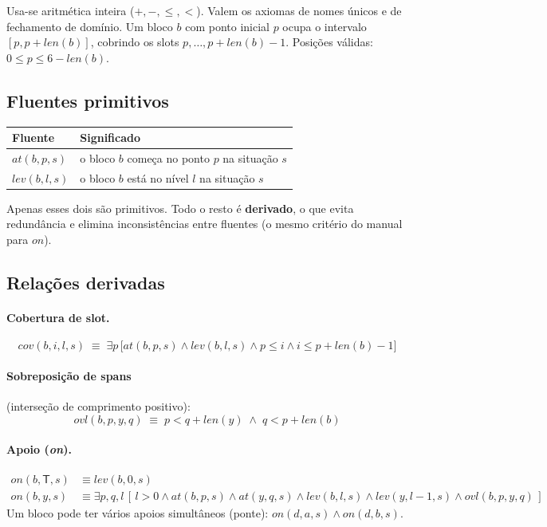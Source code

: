 \documentclass[11pt,a4paper]{article}
\newcommand{\At}{\mathit{at}}
\newcommand{\Lev}{\mathit{lev}}
\newcommand{\On}{\mathit{on}}
\newcommand{\Cov}{\mathit{cov}}
\newcommand{\Ovl}{\mathit{ovl}}
\newcommand{\Len}{\mathit{len}}
\newcommand{\Mesa}{\mathsf{T}}
\begin{document}
\medskip
Usa-se aritmética inteira ($+,-,\le,<$). Valem os axiomas de nomes únicos e de fechamento de domínio.
Um bloco $b$ com ponto inicial $p$ ocupa o intervalo $[p,p+\Len(b)]$, cobrindo os slots $p,\dots,p+\Len(b)-1$. Posições válidas: $0\le p\le 6-\Len(b)$.

\subsection{Fluentes primitivos}

\begin{center}
\begin{tabular}{@{}lp{9.5cm}@{}}
\toprule
Fluente & Significado \\
\midrule
$\At(b,p,s)$ & o bloco $b$ começa no ponto $p$ na situação $s$ \\
$\Lev(b,l,s)$ & o bloco $b$ está no nível $l$ na situação $s$ \\
\bottomrule
\end{tabular}
\end{center}

Apenas esses dois são primitivos. Todo o resto é \textbf{derivado}, o que evita redundância e elimina inconsistências entre fluentes (o mesmo critério do manual para $\On$).

\subsection{Relações derivadas}

\paragraph{Cobertura de slot.}
\[
\Cov(b,i,l,s)\;\equiv\;\exists p\,\big[\At(b,p,s)\wedge\Lev(b,l,s)\wedge p\le i\wedge i\le p+\Len(b)-1\big]
\]

\paragraph{Sobreposição de spans} (interseção de comprimento positivo):
\[
\Ovl(b,p,y,q)\;\equiv\; p<q+\Len(y)\;\wedge\; q<p+\Len(b)
\]

\paragraph{Apoio (\emph{on}).}
\begin{align*}
\On(b,\Mesa,s)&\equiv \Lev(b,0,s)\\
\On(b,y,s)&\equiv \exists p,q,l\,[\,l>0\wedge \At(b,p,s)\wedge\At(y,q,s)\wedge\Lev(b,l,s)\wedge\Lev(y,l-1,s)\wedge\Ovl(b,p,y,q)\,]
\end{align*}
Um bloco pode ter vários apoios simultâneos (ponte): $\On(d,a,s)\wedge\On(d,b,s)$.
\end{document}
